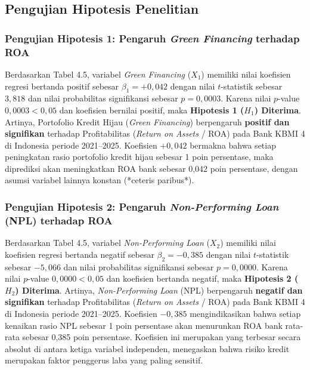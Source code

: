 \documentclass[12pt,a4paper]{article}
\numberwithin{equation}{section}
\begin{document}
\subsection{Pengujian Hipotesis Penelitian}

\subsubsection{Pengujian Hipotesis 1: Pengaruh \emph{Green Financing} terhadap ROA}
\noindent
Berdasarkan Tabel 4.5, variabel \emph{Green Financing} ($X_1$) memiliki nilai koefisien regresi bertanda positif sebesar $\beta_1 = +0{,}042$ dengan nilai $t$-statistik sebesar $3{,}818$ dan nilai probabilitas signifikansi sebesar $p = 0{,}0003$. Karena nilai $p$-value $0{,}0003 < 0{,}05$ dan koefisien bernilai positif, maka \textbf{Hipotesis 1 ($H_1$) Diterima}. Artinya, Portofolio Kredit Hijau (\emph{Green Financing}) berpengaruh \textbf{positif dan signifikan} terhadap Profitabilitas (\emph{Return on Assets} / ROA) pada Bank KBMI 4 di Indonesia periode 2021--2025. Koefisien $+0{,}042$ bermakna bahwa setiap peningkatan rasio portofolio kredit hijau sebesar 1 poin persentase, maka diprediksi akan meningkatkan ROA bank sebesar 0,042 poin persentase, dengan asumsi variabel lainnya konstan (*ceteris paribus*).

\subsubsection{Pengujian Hipotesis 2: Pengaruh \emph{Non-Performing Loan} (NPL) terhadap ROA}
\noindent
Berdasarkan Tabel 4.5, variabel \emph{Non-Performing Loan} ($X_2$) memiliki nilai koefisien regresi bertanda negatif sebesar $\beta_2 = -0{,}385$ dengan nilai $t$-statistik sebesar $-5{,}066$ dan nilai probabilitas signifikansi sebesar $p = 0{,}0000$. Karena nilai $p$-value $0{,}0000 < 0{,}05$ dan koefisien bertanda negatif, maka \textbf{Hipotesis 2 ($H_2$) Diterima}. Artinya, \emph{Non-Performing Loan} (NPL) berpengaruh \textbf{negatif dan signifikan} terhadap Profitabilitas (\emph{Return on Assets} / ROA) pada Bank KBMI 4 di Indonesia periode 2021--2025. Koefisien $-0{,}385$ mengindikasikan bahwa setiap kenaikan rasio NPL sebesar 1 poin persentase akan menurunkan ROA bank rata-rata sebesar 0,385 poin persentase. Koefisien ini merupakan yang terbesar secara absolut di antara ketiga variabel independen, menegaskan bahwa risiko kredit merupakan faktor penggerus laba yang paling sensitif.
\end{document}
